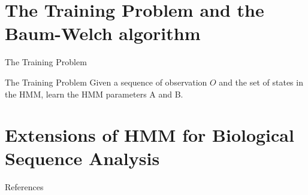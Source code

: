 \documentclass{beamer}
\begin{document}
\section{The Training Problem and the Baum-Welch algorithm}
\begin{frame}{The Training Problem }
	\begin{block}{The Training Problem}
		Given a sequence of observation $O$ and the set of states in the HMM, learn the HMM parameters A and B.
	\end{block}
\end{frame}

\section{Extensions of HMM for Biological Sequence Analysis}
\begin{frame}{References}
	
	
\end{frame}
\end{document}
